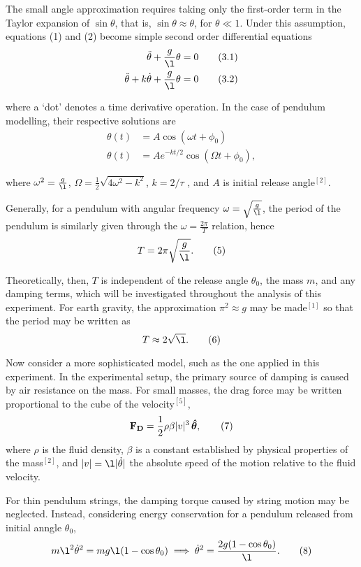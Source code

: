 \documentclass[11pt]{article}
\begin{document}
\begin{multicols}{2}
    The small angle approximation requires taking only the first-order term in the Taylor expansion of $\sin\theta$, that is, $\sin\theta\approx\theta$, for $\theta\ll 1$. Under this assumption, equations (1) and (2) become simple second order differential equations
    \begin{align*}
        \ddot\theta + \frac{g}{\l}\theta &= 0 \tag{3.1}\\
        \ddot\theta + k\dot\theta + \frac{g}{\l}\theta &=0 \tag{3.2}
    \end{align*}

    \nd where a `dot' denotes a time derivative operation. In the case of pendulum modelling, their respective solutions are 
    \begin{align*}
        \theta(t) &= A\cos(\omega t+\phi_0) \tag{4.1}\\
        \theta(t) &= Ae^{-kt/2}\cos\left(\Omega t + \phi_0\right),  \tag{4.2}
    \end{align*}

    \nd where $\omega^2 = \frac{g}{\l}$, $\Omega = \frac{1}{2}\sqrt{4\omega^2-k^2}$, $k = 2/\tau$ , and $A$ is initial release angle$^{[2]}$.


    Generally, for a pendulum with angular frequency $\omega = \sqrt{\frac{g}{\l}}$, the period of the pendulum is similarly given through the $\omega = \frac{2\pi}{T}$ relation, hence \[T = 2\pi\sqrt{\frac{g}{\l}}. \tag{5}\] 
    
    Theoretically, then, $T$ is independent of the release angle $\theta_0$, the mass $m$, and any damping terms, which will be investigated throughout the analysis of this experiment. For earth gravity, the approximation $\pi^2\approx g$ may be made$^{[1]}$ so that the period may be written as 
    \[
        T\approx 2\sqrt{\l}. \tag{6}  
    \]
    
    Now consider a more sophisticated model, such as the one applied in this experiment. In the experimental setup, the primary source of damping is caused by air resistance on the mass. For small masses, the drag force may be written proportional to the cube of the velocity$^{[5]}$,
    \[
        {\bf{F_D}} = \frac{1}{2}\rho \beta |v|^3\, {\boldsymbol{\hat \theta}}, \tag{7}   
    \]
    \nd where $\rho$ is the fluid density, $\beta$ is a constant established by physical properties of the mass$^{[2]}$, and $|v| = \l|\dot\theta|$ the absolute speed of the motion relative to the fluid velocity. 

    For thin pendulum strings, the damping torque caused by string motion may be neglected. Instead, considering energy conservation for a pendulum released from initial anngle $\theta_0$,
    \[
        m\l^2\dot\theta^2 = mg\l (1-\cos\theta_0) \implies \dot\theta^2 = \frac{2g(1-\cos\theta_0)}{\l}. \tag{8}
    \]
    

\end{multicols}
\end{document}
